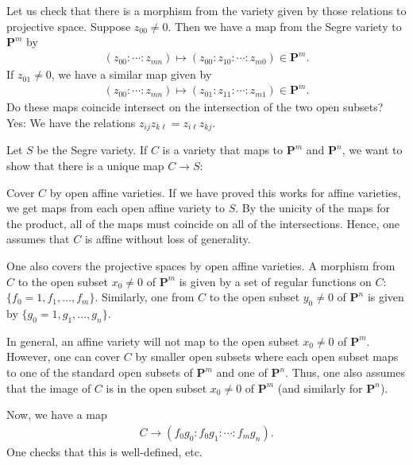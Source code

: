 \documentclass[11pt, oneside,margin=1in]{article}
\begin{document}
Let us check that there is a morphism from the variety given by those relations to projective space. Suppose $z_{00}\ne 0$. Then we have a map from the Segre variety to $\mathbf{P}^m$ by
\begin{align*}
(z_{00}:\cdots:z_{mn})\longmapsto (z_{00}:z_{10}:\cdots:z_{m0})\in \mathbf{P}^m.	
\end{align*}
If $z_{01}\ne 0$, we have a similar map given by
\begin{align*}
	(z_{00}:\cdots:z_{mn})\longmapsto (z_{01}:z_{11}:\cdots:z_{m1})\in \mathbf{P}^m.
\end{align*}
Do these maps coincide intersect on the intersection of the two open subsets? Yes: We have the relations $z_{ij}z_{k\ell} = z_{i\ell}z_{kj}$. 

Let $S$ be the Segre variety. If $C$ is a variety that maps to $\mathbf{P}^m$ and $\mathbf{P}^n$, we want to show that there is a unique map $C\longrightarrow S$:
\begin{center}
\end{center}
Cover $C$ by open affine varieties. If we have proved this works for affine varieties, we get maps from each open affine variety to $S$. By the unicity of the maps for the product, all of the maps must coincide on all of the intersections. Hence, one assumes that $C$ is affine without loss of generality.

One also covers the projective spaces by open affine varieties. A morphism from $C$ to the open subset $x_0\ne 0$ of $\mathbf{P}^m$ is given by a set of regular functions on $C$: $\{f_0=1,f_1,\hdots, f_m\}$. Similarly, one from $C$ to the open subset $y_0\ne 0$ of $\mathbf{P}^n$ is given by $\{g_0=1,g_1,\hdots, g_n\}$. 

In general, an affine variety will not map to the open subset $x_0\ne 0$ of $\mathbf{P}^m$. However, one can cover $C$ by smaller open subsets where each open subset maps to one of the standard open subsets of $\mathbf{P}^m$ and one of $\mathbf{P}^n$. Thus, one also assumes that the image of $C$ is in the open subset $x_0\ne 0$ of $\mathbf{P}^m$ (and similarly for $\mathbf{P}^n$).

Now, we have a map 
\begin{align*}
	C\longrightarrow (f_0g_0:f_0g_1:\cdots:f_mg_n).
\end{align*}
One checks that this is well-defined, etc.
\end{document}
